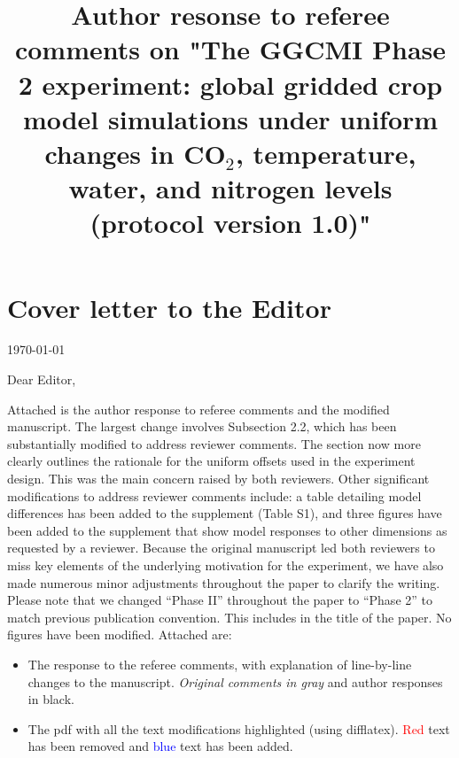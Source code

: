 \documentclass[gmd, manuscript]{copernicus} %
\begin{document}
\title{Author resonse to referee comments on "The GGCMI Phase 2 experiment: global gridded crop model simulations under uniform changes in CO$_2$, temperature, water, and nitrogen levels (protocol version 1.0)"}


\received{}
\pubdiscuss{} %
\revised{}
\accepted{}
\published{}
\maketitle

\section{Cover letter to the Editor}

\today

\bigskip

\noindent Dear Editor,

\bigskip

Attached is the author response to referee comments and the modified manuscript. 
The largest change involves Subsection 2.2, which has been substantially modified to address reviewer comments. The section now more clearly outlines the rationale for the uniform offsets used in the experiment design. This was the main concern raised by both reviewers. 
Other significant modifications to address reviewer comments include: a table detailing model differences has been added to the supplement (Table S1), and three figures have been added to the supplement that show model responses to other dimensions as requested by a reviewer. 
Because the original manuscript led both reviewers to miss key elements of the underlying motivation for the experiment, we have also made numerous minor adjustments throughout the paper to clarify the writing.
Please note that we changed “Phase II” throughout the paper to “Phase 2” to match previous publication convention. This includes in the title of the paper. 
No figures have been modified. Attached are:
\begin{itemize}
    \vspace{-2mm}
\item The response to the referee comments, with explanation of line-by-line changes to the manuscript. \noindent \textcolor{dark-gray}{\textit{Original comments in gray}} and author responses in black.
\vspace{-2mm}
\item The pdf with all the text modifications highlighted (using difflatex). \textcolor{red}{Red} text has been removed and \textcolor{blue}{blue} text has been added.  
\end{itemize}
\end{document}
